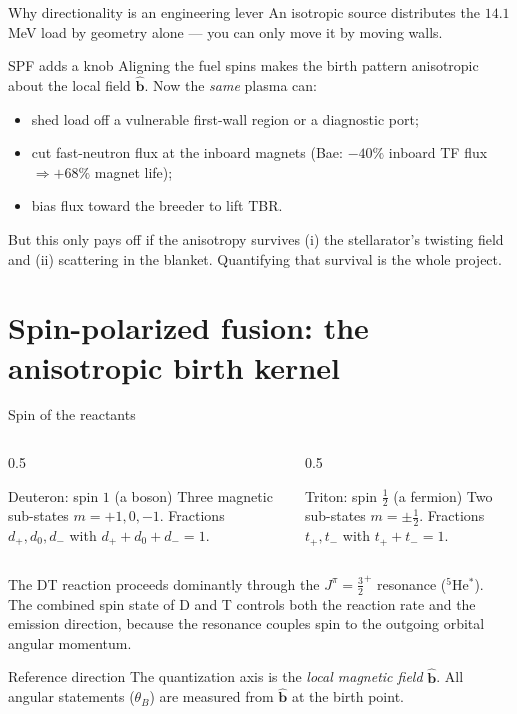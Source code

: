 \documentclass[aspectratio=169]{beamer}
\newcommand{\bb}{\hat{\bm b}}
\begin{document}
\begin{frame}[t]{Why directionality is an engineering lever}
An isotropic source distributes the $14.1$\,MeV load by geometry alone --- you can only move it by moving walls.
\vspace{0.4em}
\begin{block}{SPF adds a knob}
Aligning the fuel spins makes the birth pattern anisotropic about the local field $\bb$. Now the \emph{same} plasma can:
\begin{itemize}
  \item shed load off a vulnerable first-wall region or a diagnostic port;
  \item cut fast-neutron flux at the inboard magnets (Bae: $-40\%$ inboard TF flux $\Rightarrow +68\%$ magnet life);
  \item bias flux toward the breeder to lift TBR.
\end{itemize}
\end{block}
\vspace{0.3em}
\alert{But} this only pays off if the anisotropy survives (i) the stellarator's twisting field and (ii) scattering in the blanket. Quantifying that survival is the whole project.
\end{frame}

\section{Spin-polarized fusion: the anisotropic birth kernel}

\begin{frame}[t]{Spin of the reactants}
\begin{columns}[T]
\begin{column}{0.5\textwidth}
\begin{block}{Deuteron: spin $1$ (a boson)}
Three magnetic sub-states $m=+1,0,-1$. Fractions $d_+,d_0,d_-$ with $d_++d_0+d_-=1$.
\end{block}
\end{column}
\begin{column}{0.5\textwidth}
\begin{block}{Triton: spin $\tfrac12$ (a fermion)}
Two sub-states $m=\pm\tfrac12$. Fractions $t_+,t_-$ with $t_++t_-=1$.
\end{block}
\end{column}
\end{columns}
\vspace{0.6em}
The DT reaction proceeds dominantly through the $J^\pi=\tfrac{3}{2}^+$ resonance ($^5$He$^*$). The combined spin state of D and T controls both the reaction rate and the emission direction, because the resonance couples spin to the outgoing orbital angular momentum.
\begin{block}{Reference direction}
The quantization axis is the \emph{local magnetic field} $\bb$. All angular statements ($\theta_B$) are measured from $\bb$ at the birth point.
\end{block}
\end{frame}
\end{document}
